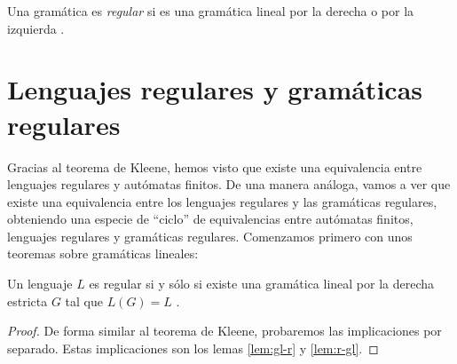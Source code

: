\begin{definicion}\label{def:gramatica-r}Una gramática es \textit{regular} si es una gramática 
lineal por la derecha o por la izquierda \cite{pfenning_2000}.
\end{definicion}

\section{Lenguajes regulares y gramáticas regulares}

Gracias al teorema de Kleene, hemos visto que existe una equivalencia entre lenguajes regulares y autómatas finitos.
De una manera análoga, vamos a ver que existe una equivalencia entre los lenguajes regulares y las gramáticas regulares,
obteniendo una especie de ``ciclo'' de equivalencias entre autómatas finitos, lenguajes regulares y gramáticas 
regulares. Comenzamos primero con unos teoremas sobre gramáticas lineales:

\begin{teorema}\label{teo:glde-lr}Un lenguaje $L$ es regular si y sólo si existe una gramática lineal por la derecha 
estricta $G$ tal que $L(G)=L$ \cite{pfenning_2000}.
\end{teorema}
\begin{proof}
De forma similar al teorema de Kleene, probaremos las implicaciones por separado. Estas implicaciones son los lemas
\ref{lem:gl-r} y \ref{lem:r-gl}.
\end{proof}

